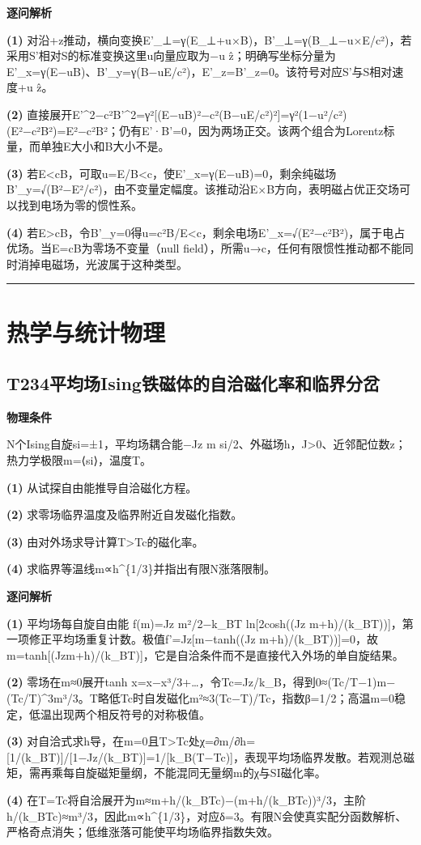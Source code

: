 \documentclass[UTF8,a4paper,11pt,oneside,openany]{ctexbook}
\begin{document}
\par\medskip\noindent\textbf{逐问解析}
\par\noindent\textbf{(1)} 对沿+z推动，横向变换E'\_⊥=γ(E\_⊥+u×B)，B'\_⊥=γ(B\_⊥−u×E/c²)，若采用S'相对S的标准变换这里u向量应取为−u ẑ；明确写坐标分量为E'\_x=γ(E−uB)、B'\_y=γ(B−uE/c²)，E'\_z=B'\_z=0。该符号对应S'与S相对速度+u ẑ。
\par\noindent\textbf{(2)} 直接展开E'\textasciicircum{}2−c²B'\textasciicircum{}2=γ²[(E−uB)²−c²(B−uE/c²)²]=γ²(1−u²/c²)(E²−c²B²)=E²−c²B²；仍有E'·B'=0，因为两场正交。该两个组合为Lorentz标量，而单独E大小和B大小不是。
\par\noindent\textbf{(3)} 若E<cB，可取u=E/B<c，使E'\_x=γ(E−uB)=0，剩余纯磁场B'\_y=√(B²−E²/c²)，由不变量定幅度。该推动沿E×B方向，表明磁占优正交场可以找到电场为零的惯性系。
\par\noindent\textbf{(4)} 若E>cB，令B'\_y=0得u=c²B/E<c，剩余电场E'\_x=√(E²−c²B²)，属于电占优场。当E=cB为零场不变量（null field），所需u→c，任何有限惯性推动都不能同时消掉电磁场，光波属于这种类型。

\par\bigskip\hrule\bigskip
\chapter{热学与统计物理}
\section*{T234\quad 平均场Ising铁磁体的自洽磁化率和临界分岔}
\textbf{物理条件}\par N个Ising自旋si=±1，平均场耦合能−Jz m si/2、外磁场h，J>0、近邻配位数z；热力学极限m=⟨si⟩，温度T。
\par\noindent\textbf{(1)} 从试探自由能推导自洽磁化方程。
\par\noindent\textbf{(2)} 求零场临界温度及临界附近自发磁化指数。
\par\noindent\textbf{(3)} 由对外场求导计算T>Tc的磁化率。
\par\noindent\textbf{(4)} 求临界等温线m∝h\textasciicircum{}\{1/3\}并指出有限N涨落限制。

\par\medskip\noindent\textbf{逐问解析}
\par\noindent\textbf{(1)} 平均场每自旋自由能 f(m)=Jz m²/2−k\_BT ln[2cosh((Jz m+h)/(k\_BT))]，第一项修正平均场重复计数。极值f'=Jz[m−tanh((Jz m+h)/(k\_BT))]=0，故m=tanh[(Jzm+h)/(k\_BT)]，它是自洽条件而不是直接代入外场的单自旋结果。
\par\noindent\textbf{(2)} 零场在m≈0展开tanh x=x−x³/3+…，令Tc=Jz/k\_B，得到0≈(Tc/T−1)m−(Tc/T)\textasciicircum{}3m³/3。T略低Tc时自发磁化m²≈3(Tc−T)/Tc，指数β=1/2；高温m=0稳定，低温出现两个相反符号的对称极值。
\par\noindent\textbf{(3)} 对自洽式求h导，在m=0且T>Tc处χ=∂m/∂h=[1/(k\_BT)]/[1−Jz/(k\_BT)]=1/[k\_B(T−Tc)]，表现平均场临界发散。若观测总磁矩，需再乘每自旋磁矩量纲，不能混同无量纲m的χ与SI磁化率。
\par\noindent\textbf{(4)} 在T=Tc将自洽展开为m≈m+h/(k\_BTc)−(m+h/(k\_BTc))³/3，主阶h/(k\_BTc)≈m³/3，因此m∝h\textasciicircum{}\{1/3\}，对应δ=3。有限N会使真实配分函数解析、严格奇点消失；低维涨落可能使平均场临界指数失效。
\end{document}
